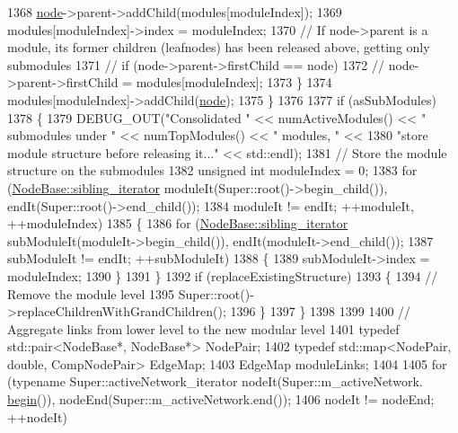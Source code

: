 \begin{DoxyCode}
1368             \mbox{\hyperlink{structnode}{node}}->parent->addChild(modules[moduleIndex]);
1369             modules[moduleIndex]->index = moduleIndex;
1370             \textcolor{comment}{// If node->parent is a module, its former children (leafnodes) has been released above,
       getting only submodules}
1371 \textcolor{comment}{//          if (node->parent->firstChild == node)}
1372 \textcolor{comment}{//              node->parent->firstChild = modules[moduleIndex];}
1373         \}
1374         modules[moduleIndex]->addChild(\mbox{\hyperlink{structnode}{node}});
1375     \}
1376 
1377     \textcolor{keywordflow}{if} (asSubModules)
1378     \{
1379         DEBUG\_OUT(\textcolor{stringliteral}{"Consolidated "} << numActiveModules() << \textcolor{stringliteral}{" submodules under "} << numTopModules() << \textcolor{stringliteral}{"
       modules, "} <<
1380                 \textcolor{stringliteral}{"store module structure before releasing it..."} << std::endl);
1381         \textcolor{comment}{// Store the module structure on the submodules}
1382         \textcolor{keywordtype}{unsigned} \textcolor{keywordtype}{int} moduleIndex = 0;
1383         \textcolor{keywordflow}{for} (\mbox{\hyperlink{classSiblingIterator}{NodeBase::sibling\_iterator}} moduleIt(Super::root()->begin\_child()), 
      endIt(Super::root()->end\_child());
1384                 moduleIt != endIt; ++moduleIt, ++moduleIndex)
1385         \{
1386             \textcolor{keywordflow}{for} (\mbox{\hyperlink{classSiblingIterator}{NodeBase::sibling\_iterator}} subModuleIt(moduleIt->begin\_child()),
       endIt(moduleIt->end\_child());
1387                     subModuleIt != endIt; ++subModuleIt)
1388             \{
1389                 subModuleIt->index = moduleIndex;
1390             \}
1391         \}
1392         \textcolor{keywordflow}{if} (replaceExistingStructure)
1393         \{
1394             \textcolor{comment}{// Remove the module level}
1395             Super::root()->replaceChildrenWithGrandChildren();
1396         \}
1397     \}
1398 
1399 
1400     \textcolor{comment}{// Aggregate links from lower level to the new modular level}
1401     \textcolor{keyword}{typedef} std::pair<NodeBase*, NodeBase*> NodePair;
1402     \textcolor{keyword}{typedef} std::map<NodePair, double, CompNodePair> EdgeMap;
1403     EdgeMap moduleLinks;
1404 
1405     \textcolor{keywordflow}{for} (\textcolor{keyword}{typename} Super::activeNetwork\_iterator nodeIt(Super::m\_activeNetwork.
      \mbox{\hyperlink{namespacebegin}{begin}}()), nodeEnd(Super::m\_activeNetwork.end());
1406             nodeIt != nodeEnd; ++nodeIt)

\end{DoxyCode}
